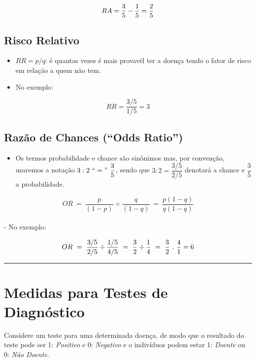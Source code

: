 \documentclass[
]{book}
\providecommand{\tightlist}{%
  \setlength{\itemsep}{0pt}\setlength{\parskip}{0pt}}
\begin{document}
\[RA =    \frac{3}{5} - {1 \over 5} = \frac{2}{5}\]

\subsection{Risco Relativo}\label{risco-relativo}

\begin{itemize}
\tightlist
\item
  \(RR = p/q\): é quantas vezes é mais provavél ter a doença tendo o fator de risco em relação a quem não tem.\\
\item
  No exemplo:
\end{itemize}

\[RR = \frac{3/5}{1/5} = 3  \]

\subsection{Razão de Chances (``Odds Ratio'')}\label{razuxe3o-de-chances-odds-ratio}

\begin{itemize}
\tightlist
\item
  Os termos probabilidade e chance são sinônimos mas, por convenção, usaremos a notação \(3:2  ~``="~ \dfrac{3}{5}\), sendo que \(3:2 = \dfrac{3/5}{2/5}\) denotará a chance e \(\dfrac{3}{5}\) a probabilidade.
\end{itemize}

\[OR ~=~ \frac{p}{(1-p)} \div \frac{q}{(1-q)} ~=~  \frac{p(1-q)}{q(1-q)}\]\\
- No exemplo:

\[OR ~=~ \frac{3/5}{2/5} \div \frac{1/5}{4/5} ~=~ \frac{3}{2} \div {1 \over 4} ~=~ \frac{3}{2} ~.~  \frac{4}{1} =  6\]

\begin{center}\rule{0.5\linewidth}{0.5pt}\end{center}

\section{Medidas para Testes de Diagnóstico}\label{medidas-para-testes-de-diagnuxf3stico}

Considere um teste para uma determinada doença, de modo que o resultado do teste pode ser 1: \emph{Positivo} e 0: \emph{Negativo} e o indivíduos podem estar 1: \emph{Doente} ou 0: \emph{Não Doente}.
\end{document}
